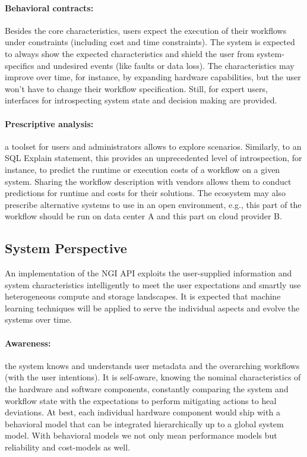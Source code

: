 \documentclass[a4paper, twocolumn]{article}
\begin{document}
\paragraph{Behavioral contracts:}
Besides the core characteristics, users expect the execution of their workflows under constraints (including cost and time constraints).
The system is expected to always show the expected characteristics and shield the user from system-specifics and undesired events (like faults or data loss).
The characteristics may improve over time, for instance, by expanding hardware capabilities, but the user won't have to change their workflow specification.
Still, for expert users, interfaces for introspecting system state and decision making are provided.

\paragraph{Prescriptive analysis:} a toolset for users and administrators allows to explore scenarios.
Similarly, to an SQL Explain statement, this provides an unprecedented level of introspection, for instance, to predict the runtime or execution costs of a workflow on a given system.
Sharing the workflow description with vendors allows them to conduct predictions for runtime and costs for their solutions.
The ecosystem may also prescribe alternative systems to use in an open environment, e.g., this part of the workflow should be run on data center A and this part on cloud provider B.



\subsection{System Perspective}

An implementation of the NGI API exploits the user-supplied information and system characteristics intelligently to meet the user expectations and smartly use heterogeneous compute and storage landscapes.
It is expected that machine learning techniques will be applied to serve the individual aspects and evolve the systems over time.

\paragraph{Awareness:}
the system knows and understands user metadata and the overarching workflows (with the user intentions).
It is self-aware, knowing the nominal characteristics of the hardware and software components, constantly comparing the system and workflow state with the expectations to perform mitigating actions to heal deviations.
At best, each individual hardware component would ship with a behavioral model that can be integrated hierarchically up to a global system model.
With behavioral models we not only mean performance models but reliability and cost-models as well.
\end{document}
